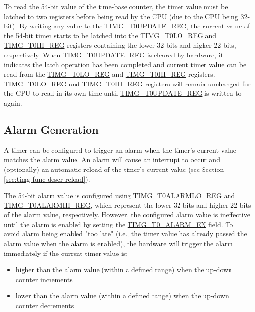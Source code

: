 \documentclass[main\_\_EN.tex]{subfiles}
\begin{document}
To read the 54-bit value of the time-base counter, the timer value must be latched to two registers before being read by the CPU (due to the CPU being 32-bit). By writing any value to the \hyperref[regdesc:TIMGTXUPDATEREG]{TIMG\_T0UPDATE\_REG}, the current value of the 54-bit timer starts to be latched into the \hyperref[regdesc:TIMGTXLOREG]{TIMG\_T0LO\_REG} and \hyperref[regdesc:TIMGTXHIREG]{TIMG\_T0HI\_REG} registers containing the lower 32-bits and higher 22-bits, respectively. When \hyperref[regdesc:TIMGTXUPDATEREG]{TIMG\_T0UPDATE\_REG} is cleared by hardware, it indicates the latch operation has been completed and current timer value can be read from the \hyperref[regdesc:TIMGTXLOREG]{TIMG\_T0LO\_REG} and \hyperref[regdesc:TIMGTXHIREG]{TIMG\_T0HI\_REG} registers. \hyperref[regdesc:TIMGTXLOREG]{TIMG\_T0LO\_REG} and \hyperref[regdesc:TIMGTXHIREG]{TIMG\_T0HI\_REG} registers will remain unchanged for the CPU to read in its own time until \hyperref[regdesc:TIMGTXUPDATEREG]{TIMG\_T0UPDATE\_REG} is written to again.

\subsection{Alarm Generation}
A timer can be configured to trigger an alarm when the timer's current value matches the alarm value. An alarm will cause an interrupt to occur and (optionally) an automatic reload of the timer's current value (see Section \ref{sec:timg-func-descr-reload}).

The 54-bit alarm value is configured using \hyperref[regdesc:TIMGTXALARMLOREG]{TIMG\_T0ALARMLO\_REG} and \hyperref[regdesc:TIMGTXALARMHIREG]{TIMG\_T0ALARMHI\_REG}, which represent the lower 32-bits and higher 22-bits of the alarm value, respectively. However, the configured alarm value is ineffective until the alarm is enabled by setting the \hyperref[fielddesc:TIMGTXALARMEN]{TIMG\_T0\_ALARM\_EN} field. To avoid alarm being enabled "too late" (i.e., the timer value has already passed the alarm value when the alarm is enabled), the hardware will trigger the alarm immediately if the current timer value is:
\begin{itemize}
    \item higher than the alarm value (within a defined range) when the up-down counter increments
    \item lower than the alarm value (within a defined range) when the up-down counter decrements
\end{itemize}
\end{document}

